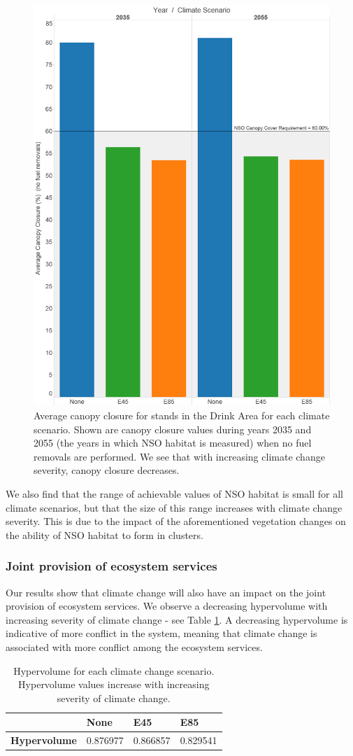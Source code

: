 \begin{figure}[ht]
\centering
\includegraphics[width=.5\textwidth]{../images/AvgCanopyCover_NoTrtmts}
\caption[Average canopy closure in the Drink Area across climate scenarios]{Average canopy closure for stands in the Drink Area for each climate scenario. Shown are canopy closure values during years 2035 and 2055 (the years in which NSO habitat is measured) when no fuel removals are performed. We see that with increasing climate change severity, canopy closure decreases.}
\label{fig:canopyClosure}
\end{figure}

We also find that the range of achievable values of NSO habitat is small for all climate scenarios, but that the size of this range increases with climate change severity. This is due to the impact of the aforementioned vegetation changes on the ability of NSO habitat to form in clusters.

\subsubsection{Joint provision of ecosystem services}
Our results show that climate change will also have an impact on the joint provision of ecosystem services. We observe a decreasing hypervolume with increasing severity of climate change - see Table \ref{tab:hypervols}. A decreasing hypervolume is indicative of more conflict in the system, meaning that climate change is associated with more conflict among the ecosystem services.

\begin{table}[]
\centering
\caption[Hypervolumes of the efficient frontiers]{Hypervolume for each climate change scenario. Hypervolume values increase with increasing severity of climate change.}
\label{tab:hypervols}
\begin{tabular}{lllll}
\multicolumn{2}{l|}{}                                                  & \textbf{None} & \textbf{E45} & \textbf{E85} \\ \hline
\multicolumn{2}{l|}{\textbf{Hypervolume}}                              & 0.876977      & 0.866857     & 0.829541       
\end{tabular}
\end{table}

